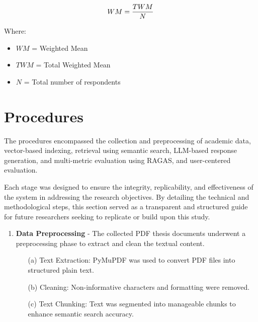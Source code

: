 \begin{refsection}
\begin{equation}
    \centering
    WM = \frac{TWM}{N}
\end{equation}

Where:
\begin{itemize}
    \item $WM$ = Weighted Mean
    \item $TWM$ = Total Weighted Mean
    \item $N$ = Total number of respondents
\end{itemize}

\section{Procedures}

The procedures encompassed the collection and preprocessing of academic data, vector-based indexing, retrieval using semantic search, LLM-based response generation, and multi-metric evaluation using RAGAS, and user-centered evaluation.

Each stage was designed to ensure the integrity, replicability, and effectiveness of the system in addressing the research objectives. By detailing the technical and methodological steps, this section served as a transparent and structured guide for future researchers seeking to replicate or build upon this study.



\begin{enumerate}

    \item \textbf{Data Preprocessing} - The collected PDF thesis documents underwent a preprocessing phase to extract and clean the textual content.
        \begin{enumerate}
            \item [(a)] {Text Extraction:} PyMuPDF was used to convert PDF files into structured plain text.
            \item [(b)] {Cleaning:} Non-informative characters and formatting were removed.
            \item [(c)] {Text Chunking:} Text was segmented into manageable chunks to enhance semantic search accuracy.
        \end{enumerate}
        

\end{enumerate}
\end{refsection}
